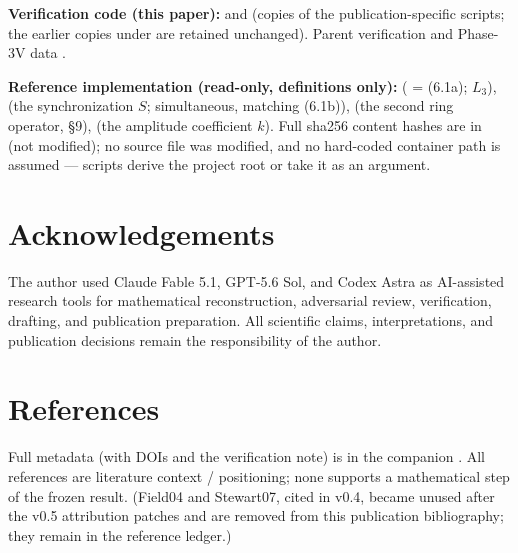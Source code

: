 \documentclass[
  11pt,
  a4paper,
]{article}
\newcounter{none} %
\begin{document}
\textbf{Verification code (this paper):}  and  (copies of the publication-specific scripts; the earlier copies under  are retained unchanged). Parent verification  and Phase-3V data .

\textbf{Reference implementation (read-only, definitions only):}  ( = (6.1a); \(L_3\)),  (the synchronization \(S\); simultaneous, matching (6.1b)),  (the second ring operator, §9),  (the amplitude coefficient \(k\)). Full sha256 content hashes are in  (not modified); no source file was modified, and no hard-coded container path is assumed --- scripts derive the project root or take it as an argument.

\section{Acknowledgements}\label{acknowledgements}

The author used Claude Fable 5.1, GPT-5.6 Sol, and Codex Astra as AI-assisted research tools for mathematical reconstruction, adversarial review, verification, drafting, and publication preparation. All scientific claims, interpretations, and publication decisions remain the responsibility of the author.

\clearpage

\section{References}\label{references}

\begingroup\fontsize{10.3}{12.8}\selectfont\raggedright

Full metadata (with DOIs and the verification note) is in the companion . All references are literature context / positioning; none supports a mathematical step of the frozen result. (Field04 and Stewart07, cited in v0.4, became unused after the v0.5 attribution patches and are removed from this publication bibliography; they remain in the reference ledger.)
\end{document}
